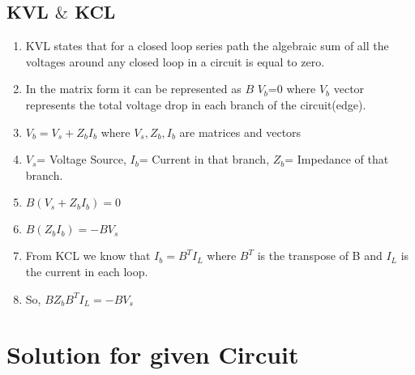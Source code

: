 \documentclass[journal,12pt,twocolumn]{IEEEtran}
\begin{document}
\subsection{KVL $\&$ KCL}

\begin{enumerate}
\item KVL states that for a closed loop series path the algebraic sum of all the voltages around any closed loop in a circuit is equal to zero.
\item In the matrix form it can be represented as $B$ $V_b$=$0$ where $V_b$ vector represents the total voltage drop in each branch of the circuit(edge).
\item $V_b = V_s + Z_bI_b$ where $V_s, Z_b, I_b $ are matrices and vectors
\item $V_s$= Voltage Source, $I_b$= Current in that branch, $Z_b$= Impedance of that branch.
\item $B(V_s + Z_bI_b) = 0$
\item $B(Z_bI_b) = -BV_s$
\item From KCL we know that $I_b=B^TI_L$ where $B^T$ is the transpose of B and $I_L$ is the current in each loop.
\item So, $BZ_bB^TI_L = -BV_s$
\end{enumerate}


\section{\textbf{Solution for given Circuit}}
\end{document}
